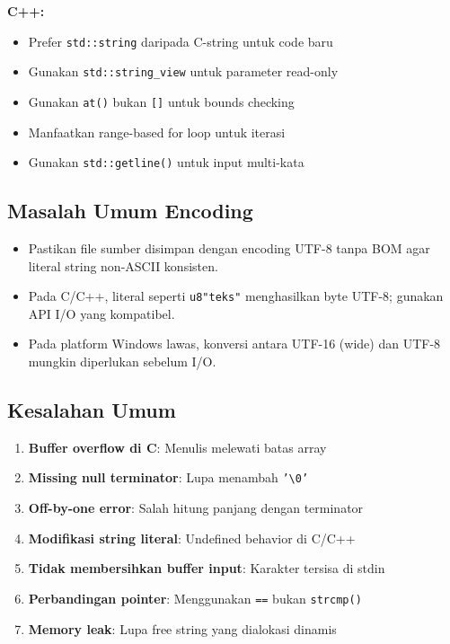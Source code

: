 \documentclass[../main.tex]{subfiles}
\begin{document}
\textbf{C++:}
\begin{itemize}
  \item Prefer \texttt{std::string} daripada C-string untuk code baru
  \item Gunakan \texttt{std::string\_view} untuk parameter read-only
  \item Gunakan \texttt{at()} bukan \texttt{[]} untuk bounds checking
  \item Manfaatkan range-based for loop untuk iterasi
  \item Gunakan \texttt{std::getline()} untuk input multi-kata
\end{itemize}

\subsection{Masalah Umum Encoding}
\begin{itemize}
  \item Pastikan file sumber disimpan dengan encoding UTF-8 tanpa BOM agar literal string non-ASCII konsisten.
  \item Pada C/C++, literal seperti \texttt{u8"teks"} menghasilkan byte UTF-8; gunakan API I/O yang kompatibel.
  \item Pada platform Windows lawas, konversi antara UTF-16 (wide) dan UTF-8 mungkin diperlukan sebelum I/O.
\end{itemize}

\subsection{Kesalahan Umum}

\begin{enumerate}
  \item \textbf{Buffer overflow di C}: Menulis melewati batas array
  \item \textbf{Missing null terminator}: Lupa menambah \texttt{'\textbackslash 0'}
  \item \textbf{Off-by-one error}: Salah hitung panjang dengan terminator
  \item \textbf{Modifikasi string literal}: Undefined behavior di C/C++
  \item \textbf{Tidak membersihkan buffer input}: Karakter tersisa di stdin
  \item \textbf{Perbandingan pointer}: Menggunakan \texttt{==} bukan \texttt{strcmp()}
  \item \textbf{Memory leak}: Lupa free string yang dialokasi dinamis
\end{enumerate}
\end{document}
